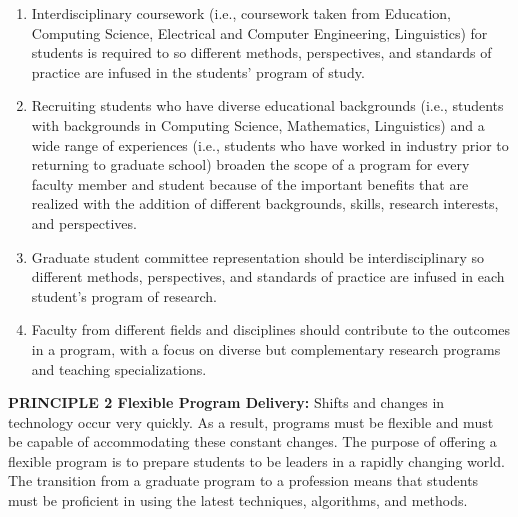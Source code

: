 \documentclass[
]{book}
\begin{document}
\begin{enumerate}
\def\labelenumi{\arabic{enumi}.}
\item
  Interdisciplinary coursework (i.e., coursework taken from Education, Computing Science, Electrical and Computer Engineering, Linguistics) for students is required to so different methods, perspectives, and standards of practice are infused in the students' program of study.
\item
  Recruiting students who have diverse educational backgrounds (i.e., students with backgrounds in Computing Science, Mathematics, Linguistics) and a wide range of experiences (i.e., students who have worked in industry prior to returning to graduate school) broaden the scope of a program for every faculty member and student because of the important benefits that are realized with the addition of different backgrounds, skills, research interests, and perspectives.
\item
  Graduate student committee representation should be interdisciplinary so different methods, perspectives, and standards of practice are infused in each student's program of research.
\item
  Faculty from different fields and disciplines should contribute to the outcomes in a program, with a focus on diverse but complementary research programs and teaching specializations.
\end{enumerate}

\textbf{PRINCIPLE 2 Flexible Program Delivery:} Shifts and changes in technology occur very quickly. As a result, programs must be flexible and must be capable of accommodating these constant changes. The purpose of offering a flexible program is to prepare students to be leaders in a rapidly changing world. The transition from a graduate program to a profession means that students must be proficient in using the latest techniques, algorithms, and methods.
\end{document}

